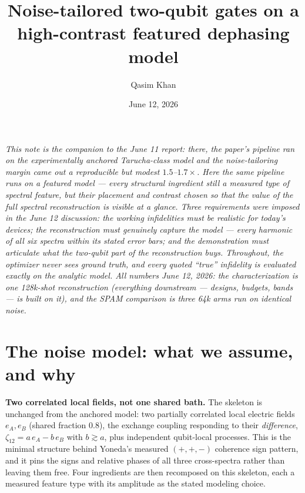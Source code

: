 \documentclass[10pt]{article}
\title{\vspace{-1.5em}Noise-tailored two-qubit gates on a high-contrast
featured dephasing model\vspace{-0.4em}}
\author{Qasim Khan}
\date{June 12, 2026}
\begin{document}
\maketitle
\vspace{-1.8em}

\textit{This note is the companion to the June 11 report: there, the paper's
pipeline ran on the experimentally anchored Tarucha-class model and the
noise-tailoring margin came out a reproducible but modest $1.5$--$1.7\times$.
Here the same pipeline runs on a \emph{featured} model --- every structural
ingredient still a measured type of spectral feature, but their placement and
contrast chosen so that the value of the full spectral reconstruction is
visible at a glance. Three requirements were imposed in the June 12
discussion: the working infidelities must be realistic for today's devices;
the reconstruction must genuinely capture the model --- every harmonic of all
six spectra within its stated error bars; and the demonstration must
articulate what the two-qubit part of the reconstruction buys. Throughout,
the optimizer never sees ground truth, and every quoted ``true'' infidelity
is evaluated exactly on the analytic model. All numbers June 12, 2026: the
characterization is one 128k-shot reconstruction (everything downstream ---
designs, budgets, bands --- is built on it), and the SPAM comparison is three
64k arms run on identical noise.}

\section{The noise model: what we assume, and why}\label{sec:model}

\textbf{Two correlated local fields, not one shared bath.} The skeleton is
unchanged from the anchored model: two partially correlated local electric
fields $e_A, e_B$ (shared fraction 0.8), the exchange coupling responding to
their \emph{difference}, $\zeta_{12} = a\,e_A - b\,e_B$ with $b \gtrsim a$,
plus independent qubit-local processes. This is the minimal structure behind
Yoneda's measured $(+,+,-)$ coherence sign pattern, and it pins the signs and
relative phases of all three cross-spectra rather than leaving them free.
Four ingredients are then recomposed on this skeleton, each a measured
feature type with its amplitude as the stated modeling choice.
\end{document}

